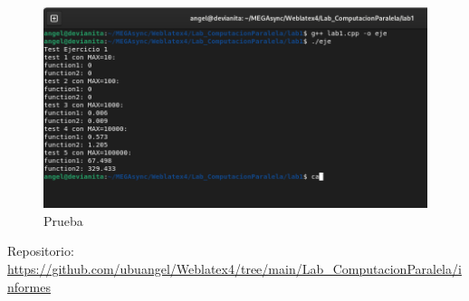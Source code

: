 \documentclass[12pt]{article}
\begin{document}
\begin{figure}[H]%
  \centering
  \includegraphics[width=15cm]{imagenes/Captura de pantalla de 2023-09-17 23-32-14.png}
  
  \caption{Prueba }
  \label{fig:algo}

\end{figure}







Repositorio: \url{https://github.com/ubuangel/Weblatex4/tree/main/Lab_ComputacionParalela/informes}

\vspace{20 mm}







\printbibliography
\end{document}
